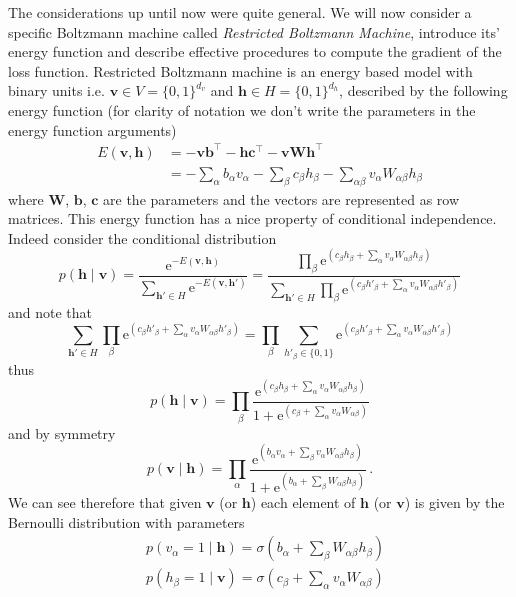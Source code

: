 \documentclass[a5paper]{article}
\newcommand{\tpose}{\intercal}
\newcommand{\e}{\mathrm{e}}
\begin{document}
The considerations up until now were quite general. We will now consider a specific Boltzmann
machine called \emph{Restricted Boltzmann Machine}, introduce its' energy function and describe
effective procedures to compute the gradient of the loss function. Restricted Boltzmann machine is an
energy based model with binary units i.e. \(\bm{v} \in V = \{0,1\}^{d_v}\) and \(\bm{h} \in H =
\{0,1\}^{d_h}\), described by the following energy function (for clarity of notation we don't write
the parameters in the energy function arguments)
\[
\begin{split}
   E(\bm{v}, \bm{h}) &= -\bm{v}\bm{b}^\tpose - \bm{h}\bm{c}^\tpose - \bm{v}\bm{W}\bm{h}^\tpose \\
                     &= -\sum_{\alpha} b_\alpha v_\alpha -\sum_{\beta} c_\beta h_\beta - \sum_{\alpha\beta} v_\alpha W_{\alpha\beta} h_\beta
\end{split}
\]
where \(\bm{W}\), \(\bm{b}\), \(\bm{c}\) are the parameters and the vectors are represented as row
matrices. This energy function has a nice property of conditional independence. Indeed consider the
conditional distribution
\[
   p(\bm{h} \mid \bm{v}) = \frac{\e^{-E(\bm{v},\bm{h})}}{\sum_{\bm{h}' \in H} \e^{-E(\bm{v}, \bm{h}')}}
   = \frac{\prod_\beta \e^{(c_\beta h_\beta + \sum_\alpha v_\alpha W_{\alpha\beta} h_\beta)}}{ \sum_{\bm{h}' \in H} \prod_\beta \e^{(c_\beta h'_\beta + \sum_\alpha v_\alpha W_{\alpha\beta} h'_\beta)}}
\]
and note that
\[
   \sum_{\bm{h}' \in H} \prod_\beta \e^{(c_\beta h'_\beta + \sum_\alpha v_\alpha W_{\alpha\beta} h'_\beta)}
   = \prod_\beta \sum_{h'_\beta \in \{0,1\}} \e^{(c_\beta h'_\beta + \sum_\alpha v_\alpha W_{\alpha\beta} h'_\beta)}
\]
thus
\[
   p(\bm{h} \mid \bm{v}) = \prod_\beta \frac{\e^{(c_\beta h_\beta + \sum_\alpha v_\alpha W_{\alpha\beta} h_\beta)}}{1 + \e^{(c_\beta + \sum_\alpha v_\alpha W_{\alpha\beta})}}
\]
and by symmetry
\[
   p(\bm{v} \mid \bm{h}) = \prod_\alpha \frac{\e^{(b_\alpha v_\alpha + \sum_\beta v_\alpha W_{\alpha\beta} h_\beta)}}{1 + \e^{(b_\alpha + \sum_\beta  W_{\alpha\beta} h_\beta)}}\,.
\]
We can see therefore that given \(\bm{v}\) (or \(\bm{h}\)) each element of \(\bm{h}\) (or \(\bm{v}\))
is given by the Bernoulli distribution with parameters
\[
\begin{split}
   &p(v_\alpha = 1 \mid \bm{h}) = \sigma\left( b_\alpha + \sum_\beta W_{\alpha\beta}h_\beta \right)\\
   &p(h_\beta = 1 \mid \bm{v}) = \sigma\left( c_\beta + \sum_\alpha v_\alpha W_{\alpha\beta} \right)\\
\end{split}
\]
\end{document}
